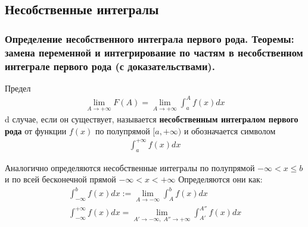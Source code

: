 \documentclass[10pt]{article}
\begin{document}
    
    \subsection{Несобственные интегралы}
    \subsubsection{Определение несобственного интеграла первого рода. Теоремы: замена переменной и интегрирование по частям в несобственном интеграле первого рода (с доказательствами).}
    \begin{definition}
        Предел
        \begin{gather*}
            \lim_{A \to + \infty} F(A) = \lim_{A \to +\infty}\int_{a}^{A} f(x) dx
        \end{gather*}
        d случае, если он существует, называется \textbf{несобственным интегралом первого рода} от функции $f(x)$ по полупрямой $[a, +\infty)$ и обозначается символом
        \begin{gather*}
            \int_{a}^{+\infty} f(x) dx
        \end{gather*}
        \begin{remark}
            Аналогично определяются несобственные интегралы по полупрямой $-\infty < x \leq b$ и по всей бесконечной прямой $-\infty < x < +\infty$
            Определяются они как:
            \begin{gather*}
                \int_{-\infty}^{b} f(x) dx := \lim_{A \to -\infty} \int_{A}^{b} f(x) dx\\
                \int_{-\infty}^{+\infty} f(x) dx = \lim_{A' \to -\infty,\; A'' \to +\infty} \int_{A'}^{A''} f(x) dx
            \end{gather*}
        \end{remark}
    \end{definition}
\end{document}
